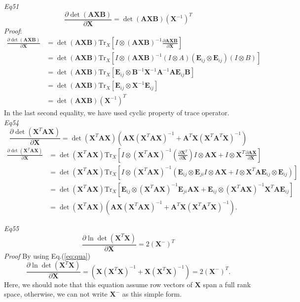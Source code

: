 \documentclass[a4paper,11pt]{article}
\def\tr{\mathrm{Tr}}
\def\m#1{\mathbf{#1}}
\begin{document}
\emph{Eq51}
\begin{equation}
    \frac{\partial \det (\m A \m X \m B)}{\partial \m X} = \det (\m A \m X \m B)(\m X^{-1})^T
\end{equation}
\emph{Proof}:
\begin{align}
    \frac{\partial \det (\m A \m X \m B)}{\partial \m X} & = \det (\m A \m X \m B) \tr_X[I \otimes (\m A \m X \m B)^{-1} \frac{\partial \m A \m X \m B}{\partial \m X}] \\
    & = \det (\m A \m X \m B) \tr_X[I \otimes (\m A \m X \m B)^{-1} (I \otimes A) (\m E_{ij} \otimes \m E_{ij}) (I \otimes B)] \\ 
    & = \det (\m A \m X \m B) \tr_X [\m E_{ij} \otimes \m B^{-1} \m X^{-1} \m A^{-1} \m A \m E_{ij} \m B] \\ 
    & = \det (\m A \m X \m B) \tr_X[\m E_{ij} \otimes \m X^{-1} \m E_{ij}] \\
    & = \det (\m A \m X \m B) (\m X^{-1})^T 
\end{align}
In the last second equality, we have used cyclic property of trace operator.\\

\emph{Eq54}
\begin{equation}
    \label{eq:qua}
    \frac{\partial \det(\m X^T \m A \m X)}{\partial \m X} = \det(\m X^T \m A \m X)\left(\m A \m X(\m X^T \m A \m X)^{-1} + \m A^T \m X (\m X^T \m A^T \m X)^{-1}\right)
\end{equation}
\begin{align}
    \frac{\partial \det(\m X^T \m A \m X)}{\partial \m X} & = \det (\m X^T \m A \m X) \tr_X \left[I \otimes (\m X^T \m A \m X)^{-1} (\frac{\partial \m X^T}{\partial \m X}) I \otimes \m A \m X + I \otimes \m X^T \frac{\partial \m A \m X}{\partial \m X}\right] \\
    & = \det (\m X^T \m A \m X) \tr_X \left[I \otimes (\m X^T \m A \m X)^{-1}(\m E_{ij} \otimes \m E_{ji}I \otimes \m A \m X + I \otimes \m X^T \m A \m E_{ij}\otimes\m E_{ij}) \right] \\ 
    & = \det (\m X^T \m A \m X) \tr_X \left[\m E_{ij}\otimes (\m X^T \m A \m X)^{-1}\m E_{ji}\m A \m X + \m E_{ij} \otimes (\m X^T \m A \m X)^{-1} \m X^T \m A \m E_{ij}\right] \\
    & = \det(\m X^T \m A \m X)\left(\m A \m X(\m X^T \m A \m X)^{-1} + \m A^T \m X (\m X^T \m A^T \m X)^{-1}\right).
\end{align}

\emph{Eq55}
\begin{equation}
    \frac{\partial \ln \det(\m X^T \m X)}{\partial \m X} = 2(\m X^{-})^T
\end{equation}
\emph{Proof} By using Eq.(\ref{eq:qua})
\begin{equation}
    \frac{\partial \ln \det(\m X^T \m X)}{\partial \m X}  = (\m X(\m X^T \m X)^{-1} + \m X (\m X^T \m X)^{-1}) = 2 (\m X^{-})^T.
\end{equation}
Here, we should note that this equation assume row vectors of $\m X$ span a full rank space, otherwise, we can not write $\m X^{-}$ as this simple form.
\end{document}
